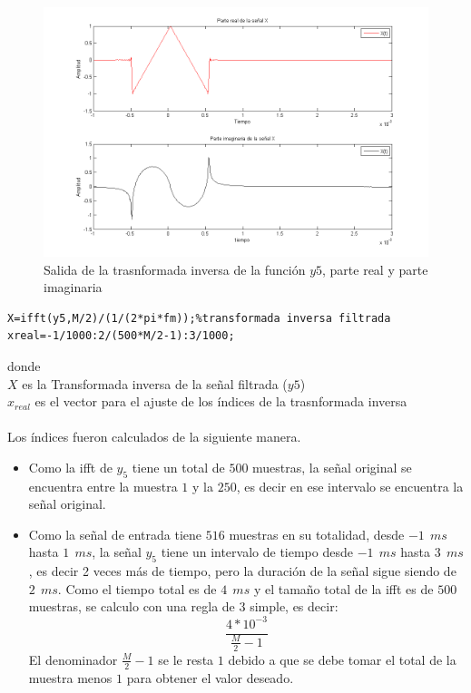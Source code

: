 \documentclass[onecolumn]{IEEEtran}
\begin{document}
\begin{figure}[]
		\includegraphics[scale=0.55]{4.png}
	\caption{Salida de la trasnformada inversa de la función $y5$, parte real y parte imaginaria}
    \label{fig5}
\end{figure}
\begin{verbatim}
X=ifft(y5,M/2)/(1/(2*pi*fm));%transformada inversa filtrada
xreal=-1/1000:2/(500*M/2-1):3/1000;
\end{verbatim}
\noindent
donde\\
$X$ es la Transformada inversa de la señal filtrada ($y5$)\\
$x_{real}$ es el vector para el ajuste de los índices de la trasnformada inversa\\\\
Los índices fueron calculados de la siguiente manera.
\begin{itemize}
 \item Como la ifft de $y_5$ tiene un total de $500$ muestras, la señal original se encuentra entre la muestra $1$ y la $250$, es decir en ese intervalo se encuentra la señal original.
 \item Como la señal de entrada tiene $516$ muestras en su totalidad, desde $-1 \ \ ms$ hasta $1\ \ ms$, la señal $y_5$ tiene un intervalo de tiempo desde $-1 \ \ ms$ hasta $3\ \ ms$, es decir 2 veces más de tiempo, pero la duración de la señal sigue siendo de $2\ \ ms$. Como el tiempo total es de $4\ \ ms$ y el tamaño total de la ifft es de $500$ muestras, se calculo con una regla de $3$ simple, es decir:
$$\frac{4*10^{-3}} {\frac{M}{2}-1}$$
\noindent
El denominador $\frac{M}{2}-1$ se le resta $1$ debido a que se debe tomar el total de la muestra menos $1$ para obtener el valor deseado.
\end{itemize}
\end{document}
